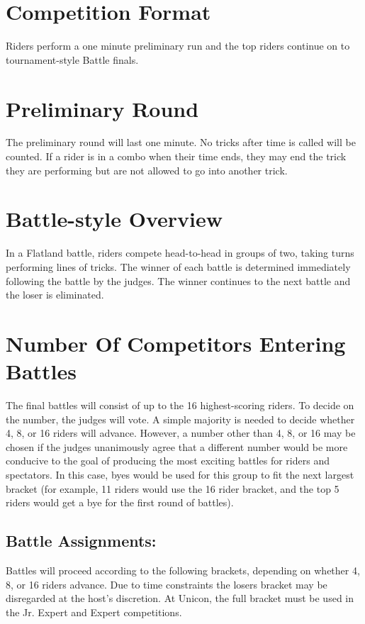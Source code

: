 \section{Competition Format}
Riders perform a one minute preliminary run and the top riders continue on to tournament-style Battle finals.

\section{Preliminary Round}
The preliminary round will last one minute.
No tricks after time is called will be counted.
If a rider is in a combo when their time ends, they may end the trick they are performing but are not allowed to go into another trick.

\section{Battle-style Overview}
In a Flatland battle, riders compete head-to-head in groups of two, taking turns performing lines of tricks.
The winner of each battle is determined immediately following the battle by the judges.
The winner continues to the next battle and the loser is eliminated.

\section{Number Of Competitors Entering Battles}
The final battles will consist of up to the 16 highest-scoring riders.
To decide on the number, the judges will vote.
A simple majority is needed to decide whether 4, 8, or 16 riders will advance.
However, a number other than 4, 8, or 16 may be chosen if the judges unanimously agree that a different number would be more conducive to the goal of producing the most exciting battles for riders and spectators.
In this case, byes would be used for this group to fit the next largest bracket (for example, 11 riders would use the 16 rider bracket, and the top 5 riders would get a bye for the first round of battles).

\subsection{Battle Assignments:}
Battles will proceed according to the following brackets, depending on whether 4, 8, or 16 riders advance. Due to time constraints the losers bracket may be disregarded at the host's discretion. At Unicon, the full bracket must be used in the Jr. Expert and Expert competitions.

